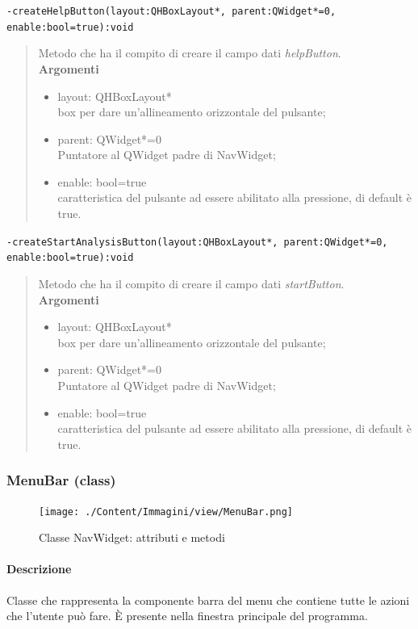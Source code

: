 \color{blue}\verb!-createHelpButton(layout:QHBoxLayout*, parent:QWidget*=0, enable:bool=true):void!
\color{black}
\begin{quote}Metodo che ha il compito di creare il campo dati \emph{helpButton}.\\
\textbf{Argomenti}
\begin{itemize}
\item layout: QHBoxLayout* \\ box per dare un'allineamento orizzontale del pulsante;
\item parent: QWidget*=0  \\ Puntatore al QWidget padre di NavWidget;
\item enable: bool=true \\ caratteristica del pulsante ad essere abilitato alla pressione, di default è true.
\end{itemize}
\end{quote}
\color{blue}\verb!-createStartAnalysisButton(layout:QHBoxLayout*, parent:QWidget*=0, enable:bool=true):void!
\color{black}
\begin{quote}Metodo che ha il compito di creare il campo dati \emph{startButton}.\\
\textbf{Argomenti}
\begin{itemize}
\item layout: QHBoxLayout* \\ box per dare un'allineamento orizzontale del pulsante;
\item parent: QWidget*=0  \\ Puntatore al QWidget padre di NavWidget;
\item enable: bool=true \\ caratteristica del pulsante ad essere abilitato alla pressione, di default è true.
\end{itemize}
\end{quote}
\color{black}
\pagebreak
\subsubsection{MenuBar (class)}
\label{spemenu}
\begin{figure}[!h]
\centering
			\texttt{[image: ./Content/Immagini/view/MenuBar.png]}
			\caption{Classe NavWidget: attributi e metodi}
			\label{cl_nav}
\end{figure}
\paragraph{Descrizione \\}
Classe che rappresenta la componente barra del menu che contiene tutte le azioni che l'utente può fare. È presente nella finestra principale del programma.
